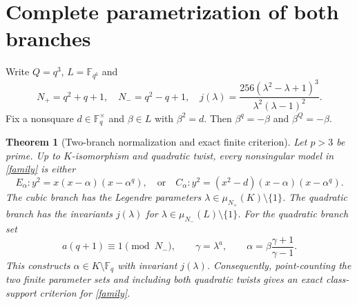 \documentclass[11pt]{article}
\newtheorem{theorem}{Theorem}
\newcommand{\F}{\mathbb F}
\newcommand{\Nm}{N_-}
\newcommand{\Np}{N_+}
\begin{document}
\section{Complete parametrization of both branches}
Write $Q=q^3$, $L=\F_{q^6}$ and
\[
 \Np=q^2+q+1,\quad \Nm=q^2-q+1,\quad
 j(\lambda)=\frac{256(\lambda^2-\lambda+1)^3}
 {\lambda^2(\lambda-1)^2}.
\]
Fix a nonsquare $d\in\F_q^\times$ and $\beta\in L$ with $\beta^2=d$.
Then $\beta^q=-\beta$ and $\beta^Q=-\beta$.

\begin{theorem}[Two-branch normalization and exact finite criterion]\label{normalize}
Let $p>3$ be prime. Up to $K$-isomorphism and quadratic twist, every
nonsingular model in \eqref{family} is either
\[
 E_\alpha:y^2=x(x-\alpha)(x-\alpha^q),
 \quad\text{or}\quad
 C_\alpha:y^2=(x^2-d)(x-\alpha)(x-\alpha^q).
\]
The cubic branch has the Legendre parameters
$\lambda\in\mu_{\Np}(K)\setminus\{1\}$. The quadratic branch has the
invariants $j(\lambda)$ for
$\lambda\in\mu_{\Nm}(L)\setminus\{1\}$.
For the quadratic branch set
\begin{equation}\label{reconstruct}
 a(q+1)\equiv1\pmod{\Nm},\qquad
 \gamma=\lambda^a,\qquad
 \alpha=\beta\frac{\gamma+1}{\gamma-1}.
\end{equation}
This constructs $\alpha\in K\setminus\F_q$ with invariant $j(\lambda)$.
Consequently, point-counting the two finite parameter sets and including both
quadratic twists gives an exact class-support criterion for \eqref{family}.
\end{theorem}
\end{document}
